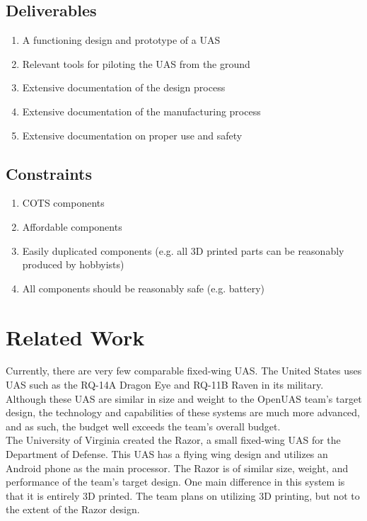 \documentclass{article}
\begin{document}
\subsection{Deliverables}
\begin{enumerate}
\item A functioning design and prototype of a UAS
\item Relevant tools for piloting the UAS from the ground
\item Extensive documentation of the design process
\item Extensive documentation of the manufacturing process
\item Extensive documentation on proper use and safety
\end{enumerate}

\subsection{Constraints}
\begin{enumerate}
\item COTS components
\item Affordable components
\item Easily duplicated components (e.g. all 3D printed parts can be reasonably produced by hobbyists)
\item All components should be reasonably safe (e.g. battery)
\end{enumerate}

\section{Related Work}
\noindent Currently, there are very few comparable fixed-wing UAS. The United States uses UAS such as the RQ-14A Dragon Eye and RQ-11B Raven in its military. Although these UAS are similar in size and weight to the OpenUAS team's target design, the technology and capabilities of these systems are much more advanced, and as such, the budget well exceeds the team's overall budget.\\

\noindent The University of Virginia created the Razor, a small fixed-wing UAS for the Department of Defense. This UAS has a flying wing design and utilizes an Android phone as the main processor. The Razor is of similar size, weight, and performance of the team's target design. One main difference in this system is that it is entirely 3D printed. The team plans on utilizing 3D printing, but not to the extent of the Razor design.\\
\end{document}
